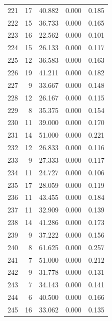 \begin{table}
\begin{tabular}{rrrrr}
 221 &     17 &         40.882 &        0.000 &           0.185 \\
 222 &     15 &         36.733 &        0.000 &           0.165 \\
 223 &     16 &         22.562 &        0.000 &           0.101 \\
 224 &     15 &         26.133 &        0.000 &           0.117 \\
 225 &     12 &         36.583 &        0.000 &           0.163 \\
 226 &     19 &         41.211 &        0.000 &           0.182 \\
 227 &      9 &         33.667 &        0.000 &           0.148 \\
 228 &     12 &         26.167 &        0.000 &           0.115 \\
 229 &      8 &         35.375 &        0.000 &           0.154 \\
 230 &     11 &         39.000 &        0.000 &           0.170 \\
 231 &     14 &         51.000 &        0.000 &           0.221 \\
 232 &     12 &         26.833 &        0.000 &           0.116 \\
 233 &      9 &         27.333 &        0.000 &           0.117 \\
 234 &     11 &         24.727 &        0.000 &           0.106 \\
 235 &     17 &         28.059 &        0.000 &           0.119 \\
 236 &     11 &         43.455 &        0.000 &           0.184 \\
 237 &     11 &         32.909 &        0.000 &           0.139 \\
 238 &     14 &         41.286 &        0.000 &           0.173 \\
 239 &      9 &         37.222 &        0.000 &           0.156 \\
 240 &      8 &         61.625 &        0.000 &           0.257 \\
 241 &      7 &         51.000 &        0.000 &           0.212 \\
 242 &      9 &         31.778 &        0.000 &           0.131 \\
 243 &      7 &         34.143 &        0.000 &           0.141 \\
 244 &      6 &         40.500 &        0.000 &           0.166 \\
 245 &     16 &         33.062 &        0.000 &           0.135 \\

\end{tabular}
\end{table}
